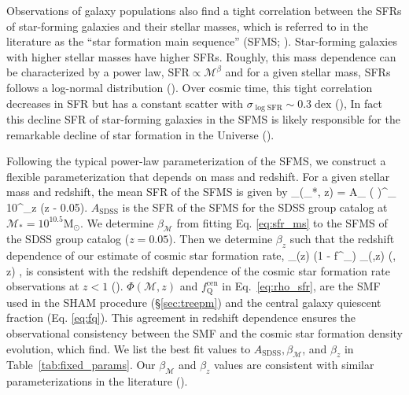 Observations of galaxy populations also find a tight correlation between the SFRs of 
star-forming galaxies and their stellar masses, which is referred 
to in the literature as the ``star formation main sequence'' 
(SFMS; \citealt{Noeske:2007aa, Oliver:2010aa, Karim:2011aa, Moustakas:2013aa}). 
Star-forming galaxies with higher stellar masses have higher SFRs. 
Roughly, this mass dependence can be characterized by a power law, 
$\mathrm{SFR} \propto \mathcal{M}^{\beta}$ and for a given stellar mass, 
SFRs follows a log-normal distribution (\citealt{Noeske:2007aa, Lee:2015aa}). 
Over cosmic time, this tight correlation decreases in SFR but has 
a constant scatter with $\sigma_{\log\mathrm{SFR}} \sim 0.3 \; \mathrm{dex}$ 
(\citealt{Noeske:2007aa, Elbaz:2007aa, Daddi:2007aa, Salim:2007aa, 
Whitaker:2012aa, Lee:2015aa}), In fact this decline SFR of star-forming 
galaxies in the SFMS is likely responsible for the remarkable decline 
of star formation in the Universe (\citealt{Hopkins:2006aa, 
Behroozi:2013ab, Madau:2014aa}).

Following the typical power-law parameterization of the SFMS, we construct a flexible  
parameterization that depends on mass and redshift. For a given stellar mass and 
redshift, the mean SFR of the SFMS is given by 
\beq \label{eq:sfr_ms}
\avgSFR_(_*, z) = A_
\left( \right)^{\beta_}
10^{\beta_z (z - 0.05)}.
\eeq
$A_\mathrm{SDSS}$ is the SFR of the SFMS for the SDSS group catalog at
$\mathcal{M}_* = 10^{10.5} \mathrm{M}_\odot$. We determine 
$\beta_\mathcal{M}$ from fitting Eq. \ref{eq:sfr_ms} to the SFMS of 
the SDSS group catalog ($z = 0.05$). Then we determine $\beta_z$ such 
that the redshift dependence of our estimate of cosmic star formation 
rate,   
\beq \label{eq:rho_sfr}
\rho_(z) \propto \int \left(1 - f^_\right)
_(,z)   
\Phi(, z) \; , 
\eeq
is consistent with the redshift dependence of the cosmic star formation 
rate observations at $z < 1$ (\citealt{Behroozi:2013ab}). 
$\Phi(\mathcal{M},z)$ and $f_\mathrm{Q}^\mathrm{cen}$ in 
Eq.~\ref{eq:rho_sfr}, are the SMF used in the SHAM procedure 
(\S \ref{sec:treepm}) and the central galaxy quiescent fraction 
(Eq. \ref{eq:fq}). 
This agreement in redshift dependence ensures the observational 
consistency between the SMF and the cosmic star formation density 
evolution, which \cite{Behroozi:2013ab} find. 
We list the best fit values to 
$A_\mathrm{SDSS}, \beta_\mathcal{M}$, and $\beta_z$ in 
Table~\ref{tab:fixed_params}. Our $\beta_\mathcal{M}$ and 
$\beta_z$ values are consistent with similar parameterizations in the literature
(\citealt{Salim:2007aa, Moustakas:2013aa, Lee:2015aa}). 

